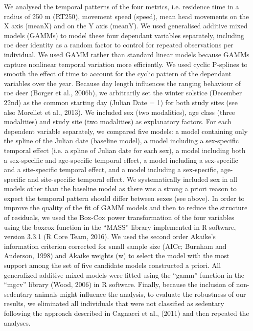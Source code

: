 \documentclass[a4paper,11pt]{article}
\begin{document}
We analysed the temporal patterns of the four metrics, i.e. residence
time in a radius of 250 m (RT250), movement speed (speed), mean head
movements on the X axis (meanX) and on the Y axis (meanY). We used
generalised additive mixed models (GAMMs) to model these four
dependant variables separately, including roe deer identity as a
random factor to control for repeated observations per individual. We
used GAMM rather than standard linear models because GAMMs capture
nonlinear temporal variation more efficiently. We used cyclic
P-splines to smooth the effect of time to account for the cyclic
pattern of the dependant variables over the year. Because day length
influences the ranging behaviour of roe deer (Borger et al., 2006b),
we arbitrarily set the winter solstice (December 22nd) as the common
starting day (Julian Date = 1) for both study sites (see also Morellet
et al., 2013). We included sex (two modalities), age class (three
modalities) and study site (two modalities) as explanatory
factors. For each dependent variable separately, we compared five
models: a model containing only the spline of the Julian date
(baseline model), a model including a sex-specific temporal effect
(i.e. a spline of Julian date for each sex), a model including both a
sex-specific and age-specific temporal effect, a model including a
sex-specific and a site-specific temporal effect, and a model
including a sex-specific, age-specific and site-specific temporal
effect. We systematically included sex in all models other than the
baseline model as there was a strong a priori reason to expect the
temporal pattern should differ between sexes (see above). In order to
improve the quality of the fit of GAMM models and then to reduce the
structure of residuals, we used the Box-Cox power transformation of
the four variables using the boxcox function in the “MASS” library
implemented in R software, version 3.3.1 (R Core Team, 2016). We used
the second order Akaike’s information criterion corrected for small
sample size (AICc; Burnham and Anderson, 1998) and Akaike weights (w)
to select the model with the most support among the set of five
candidate models constructed a priori. All generalized additive mixed
models were fitted using the “gamm” function in the “mgcv” library
(Wood, 2006) in R software. Finally, because
the inclusion of non-sedentary animals might influence the analysis,
to evaluate the robustness of our results, we eliminated all
individuals that were not classified as sedentary following the
approach described in Cagnacci et al., (2011) and then repeated the
analyses.
\end{document}
